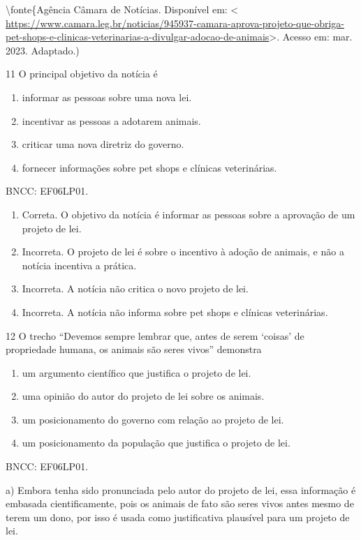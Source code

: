 \textbackslash fonte\{Agência Câmara de Notícias. Disponível em:
\textless{}
\url{https://www.camara.leg.br/noticias/945937-camara-aprova-projeto-que-obriga-pet-shops-e-clinicas-veterinarias-a-divulgar-adocao-de-animais}\textgreater.
Acesso em: mar. 2023. Adaptado.)

\num{11} O principal objetivo da notícia é

\begin{enumerate}
\def\labelenumi{\alph{enumi})}
\item
  informar as pessoas sobre uma nova lei.
\item
  incentivar as pessoas a adotarem animais.
\item
  criticar uma nova diretriz do governo.
\item
  fornecer informações sobre pet shops e clínicas veterinárias.
\end{enumerate}

BNCC: EF06LP01.

\begin{enumerate}
\def\labelenumi{\alph{enumi})}
\item
  Correta. O objetivo da notícia é informar as pessoas sobre a aprovação
  de um projeto de lei.
\item
  Incorreta. O projeto de lei é sobre o incentivo à adoção de animais, e
  não a notícia incentiva a prática.
\item
  Incorreta. A notícia não critica o novo projeto de lei.
\item
  Incorreta. A notícia não informa sobre pet shops e clínicas
  veterinárias.
\end{enumerate}

\num{12} O trecho ``Devemos sempre lembrar que, antes de serem `coisas'
de propriedade humana, os animais são seres vivos'' demonstra

\begin{enumerate}
\def\labelenumi{\alph{enumi})}
\item
  um argumento científico que justifica o projeto de lei.
\item
  uma opinião do autor do projeto de lei sobre os animais.
\item
  um posicionamento do governo com relação ao projeto de lei.
\item
  um posicionamento da população que justifica o projeto de lei.
\end{enumerate}

BNCC: EF06LP01.

a) Embora tenha sido pronunciada pelo autor do projeto de lei, essa
informação é embasada cientificamente, pois os animais de fato são seres
vivos antes mesmo de terem um dono, por isso é usada como justificativa
plausível para um projeto de lei.

